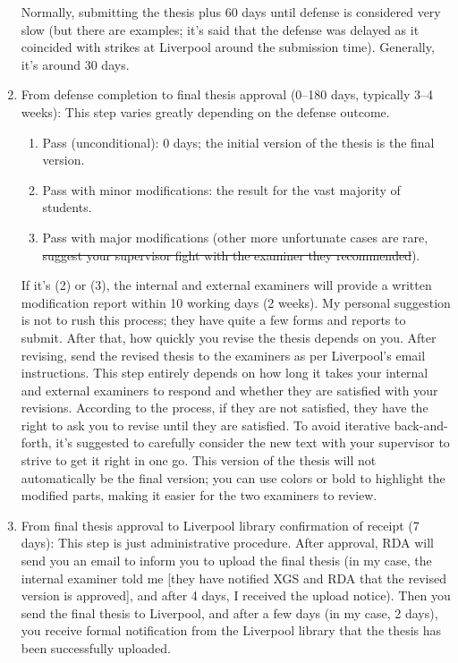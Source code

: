 \begin{enumerate}
\begin{enumerate}
    \end{enumerate}
    Normally, submitting the thesis plus 60 days until defense is considered very slow (but there are examples; it's said that the defense was delayed as it coincided with strikes at Liverpool around the submission time). Generally, it's around 30 days.
    \item From defense completion to final thesis approval (0–180 days, typically 3–4 weeks): This step varies greatly depending on the defense outcome.
    \begin{enumerate}
        \item Pass (unconditional): 0 days; the initial version of the thesis is the final version.
        \item Pass with minor modifications: the result for the vast majority of students.
        \item Pass with major modifications (other more unfortunate cases are rare, \sout{suggest your supervisor fight with the examiner they recommended}).
    \end{enumerate}
    If it's (2) or (3), the internal and external examiners will provide a written modification report within 10 working days (2 weeks). My personal suggestion is not to rush this process; they have quite a few forms and reports to submit. After that, how quickly you revise the thesis depends on you. After revising, send the revised thesis to the examiners as per Liverpool's email instructions. This step entirely depends on how long it takes your internal and external examiners to respond and whether they are satisfied with your revisions. According to the process, if they are not satisfied, they have the right to ask you to revise until they are satisfied. To avoid iterative back-and-forth, it's suggested to carefully consider the new text with your supervisor to strive to get it right in one go. This version of the thesis will not automatically be the final version; you can use colors or bold to highlight the modified parts, making it easier for the two examiners to review.
    \item From final thesis approval to Liverpool library confirmation of receipt (7 days): This step is just administrative procedure. After approval, RDA will send you an email to inform you to upload the final thesis (in my case, the internal examiner told me [they have notified XGS and RDA that the revised version is approved], and after 4 days, I received the upload notice). Then you send the final thesis to Liverpool, and after a few days (in my case, 2 days), you receive formal notification from the Liverpool library that the thesis has been successfully uploaded.

\end{enumerate}
